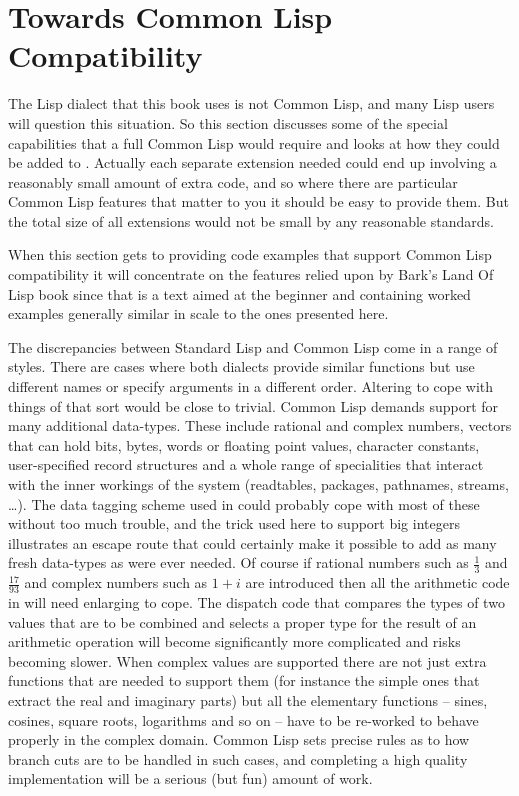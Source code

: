 \section{Towards Common Lisp Compatibility}
The Lisp dialect that this book uses is not Common Lisp, and many
Lisp users will question this situation. So this section discusses some
of the special capabilities that a full Common Lisp would require and
looks at how they could be added to \vsl. Actually each separate extension
needed could end up involving a reasonably small amount of extra code, and
so where there are particular Common Lisp features that matter to you it should
be easy to provide them. But the total size of all extensions would
not be small by any reasonable standards.

When this section gets to providing code examples that support Common Lisp
compatibility it will concentrate on the features relied upon by
Bark's Land Of Lisp book\cite{LandOfLisp} since that is a text aimed at the
beginner and containing worked examples generally similar in scale to the ones
presented here.

The discrepancies between Standard Lisp and Common Lisp come in a range
of styles. There are cases where both dialects provide similar functions but
use different names or specify arguments in a different order. Altering
\vsl{} to cope with things of that sort would be close to trivial. Common
Lisp demands support for many additional data-types. These include
rational and complex numbers, vectors that can hold bits, bytes, words
or floating point values, character constants, user-specified record
structures and a whole range of specialities that interact with the
inner workings of the system (readtables, packages, pathnames,
streams, \ldots). The data tagging scheme used in \vsl{} could
probably cope with most of these without too much trouble, and the
trick used here to support big integers illustrates an escape route that
could certainly make it possible to add as many fresh data-types as were
ever needed. Of course if rational numbers such as $\frac{1}{3}$
and $\frac{17}{93}$ and complex numbers such as $1+i$ are introduced then all
the arithmetic code in \vsl{} will need enlarging to cope. The dispatch
code that compares the types of two values that are to be combined and
selects a proper type for the result of an arithmetic operation will
become significantly more complicated and risks becoming slower. When
complex values are supported there are not just extra functions that are
needed to support them (for instance the simple ones that extract the
real and imaginary parts) but all the elementary functions -- sines,
cosines, square roots, logarithms and so on -- have to be re-worked
to behave properly in the complex domain. Common Lisp sets precise
rules as to how branch cuts are to be handled in such cases, and completing
a high quality implementation will be a serious (but fun) amount of work.

